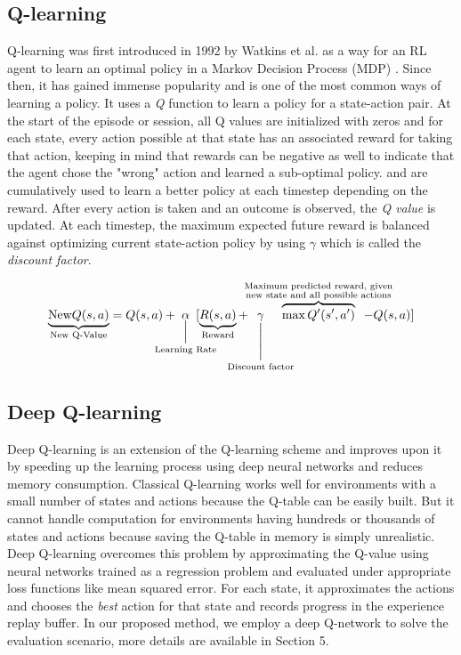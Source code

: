 \documentclass[acmsmall,review,authorversion]{acmart}
\begin{document}
\subsection{Q-learning}
Q-learning was first introduced in 1992 by Watkins et al. as a way for an RL agent to learn an optimal policy in a Markov Decision Process (MDP) \cite{Watkins92q-learning}. Since then, it has gained immense popularity and is one of the most common ways of learning a policy. It uses a \emph{Q} function to learn a policy for a state-action pair. At the start of the episode or session, all Q values are initialized with zeros and for each state, every action possible at that state has an associated reward for taking that action, keeping in mind that rewards can be negative as well to indicate that the agent chose the "wrong" action and learned a sub-optimal policy. and are cumulatively used to learn a better policy at each timestep depending on the reward. After every action is taken and an outcome is observed, the \emph{Q value} is updated. At each timestep, the maximum expected future reward is balanced against optimizing current state-action policy by using $\gamma$ which is called the \emph{discount factor}.

\[\underbrace{\text{New}Q(s,a)}_{\scriptstyle\text{New  Q-Value}}=Q(s,a)+\mkern-34mu\underset{\text{Learning Rate}}{\underset{\Bigl|}{\alpha}}\mkern-30mu[\underbrace{R(s,a)}_{\scriptstyle\text{Reward}}+\mkern-30mu\underset{\text{Discount factor}}{\underset{\Biggl|}{\gamma}}\mkern-75mu\overbrace{\max Q'(s',a')}^{\scriptstyle\substack{\text{Maximum predicted reward, given} \\ \text{new state and all possible actions}}}\mkern-45mu-Q(s,a)]\]

\subsection{Deep Q-learning}
Deep Q-learning is an extension of the Q-learning scheme and improves upon it by speeding up the learning process using deep neural networks and reduces memory consumption. Classical Q-learning works well for environments with a small number of states and actions because the Q-table can be easily built. But it cannot handle computation for environments having hundreds or thousands of states and actions because saving the Q-table in memory is simply unrealistic. Deep Q-learning overcomes this problem by approximating the Q-value using neural networks trained as a regression problem and evaluated under appropriate loss functions like mean squared error. For each state, it approximates the actions and chooses the \emph{best} action for that state and records progress in the experience replay buffer. In our proposed method, we employ a deep Q-network to solve the evaluation scenario, more details are available in Section 5.
\end{document}
